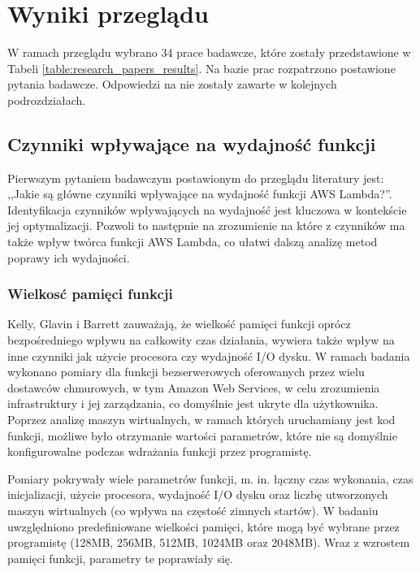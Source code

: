 \section{Wyniki przeglądu}\label{chapter:przeglad_literatury_wyniki}

W ramach przeglądu wybrano 34 prace badawcze, które zostały przedstawione w Tabeli \ref{table:research_papers_results}. 
Na bazie prac rozpatrzono postawione pytania badawcze. 
Odpowiedzi na nie zostały zawarte w kolejnych podrozdziałach.



\subsection{Czynniki wpływające na wydajność funkcji}\label{chapter:przeglad_literatury_wyniki_czynniki}

Pierwszym pytaniem badawczym postawionym do przeglądu literatury jest: ,,Jakie są główne czynniki wpływające na wydajność funkcji AWS Lambda?''.
Identyfikacja czynników wpływających na wydajność jest kluczowa w kontekście jej optymalizacji.
Pozwoli to następnie na zrozumienie na które z czynników ma także wpływ twórca funkcji AWS Lambda, co ułatwi dalszą analizę metod poprawy ich wydajności.

\subsubsection*{Wielkosć pamięci funkcji}

Kelly, Glavin i Barrett \cite{9284261} zauważają, że wielkość pamięci funkcji oprócz bezpośredniego wpływu na całkowity czas działania, wywiera także wpływ na inne czynniki jak użycie procesora czy wydajność I/O dysku. 
W ramach badania wykonano pomiary dla funkcji bezserwerowych oferowanych przez wielu dostawców chmurowych, w tym Amazon Web Services, w celu zrozumienia infrastruktury i jej zarządzania, co domyślnie jest ukryte dla użytkownika.   
Poprzez analizę maszyn wirtualnych, w ramach których uruchamiany jest kod funkcji, możliwe było otrzymanie wartości parametrów, które nie są domyślnie konfigurowalne podczas wdrażania funkcji przez programistę.

Pomiary pokrywały wiele parametrów funkcji, m. in. łączny czas wykonania, czas inicjalizacji, użycie procesora, wydajność I/O dysku oraz liczbę utworzonych maszyn wirtualnych (co wpływa na częstość zimnych startów). 
W badaniu uwzględniono predefiniowane wielkości pamięci, które mogą być wybrane przez programistę (128MB, 256MB, 512MB, 1024MB oraz 2048MB).
Wraz z wzrostem pamięci funkcji, parametry te poprawiały się.

